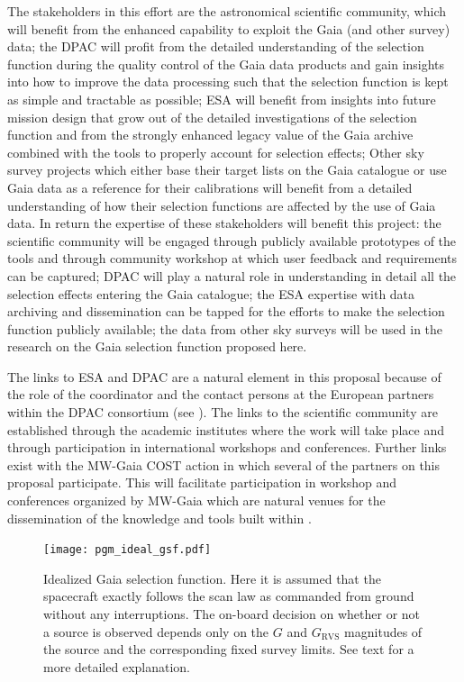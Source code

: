 The stakeholders in this effort are the astronomical scientific community, which will benefit from the enhanced capability to exploit the Gaia (and other survey) data; the DPAC will profit from the detailed understanding of the selection function during the quality control of the Gaia data products and gain insights into how to improve the data processing such that the selection function is kept as simple and tractable as possible; ESA will benefit from insights into future mission design that grow out of the detailed investigations of the selection function and from the strongly enhanced legacy value of the Gaia archive combined with the tools to properly account for selection effects; Other sky survey projects which either base their target lists on the Gaia catalogue or use Gaia data as a reference for their calibrations will benefit from a detailed understanding of how their selection functions are affected by the use of Gaia data. In return the expertise of these stakeholders will benefit this project: the scientific community will be engaged through publicly available prototypes of the {\acro} tools and through community workshop at which user feedback and requirements can be captured; DPAC will play a natural role in understanding in detail all the selection effects entering the Gaia catalogue; the ESA expertise with data archiving and dissemination can be tapped for the efforts to make the selection function publicly available; the data from other sky surveys will be used in the research on the Gaia selection function proposed here.

The links to ESA and DPAC are a natural element in this proposal because of the role of the coordinator and the contact persons at the European partners within the DPAC consortium (see ). The links to the scientific community are established through the academic institutes where the work will take place and through participation in international workshops and conferences. Further links exist with the MW-Gaia COST action in which several of the partners on this proposal participate. This will facilitate participation in workshop and conferences organized by MW-Gaia which are natural venues for the dissemination of the knowledge and tools built within {\acro}.

\begin{figure}[t]
    \centering
    \texttt{[image: pgm\_ideal\_gsf.pdf]}
    \caption{Idealized Gaia selection function. Here it is assumed that the spacecraft exactly follows the scan law as commanded from ground without any interruptions. The on-board decision on whether or not a source is observed depends only on the $G$ and $G_\mathrm{RVS}$ magnitudes of the source and the corresponding fixed survey limits. See text for a more detailed explanation.}
    \label{fig:gsf_ideal}
\end{figure}

